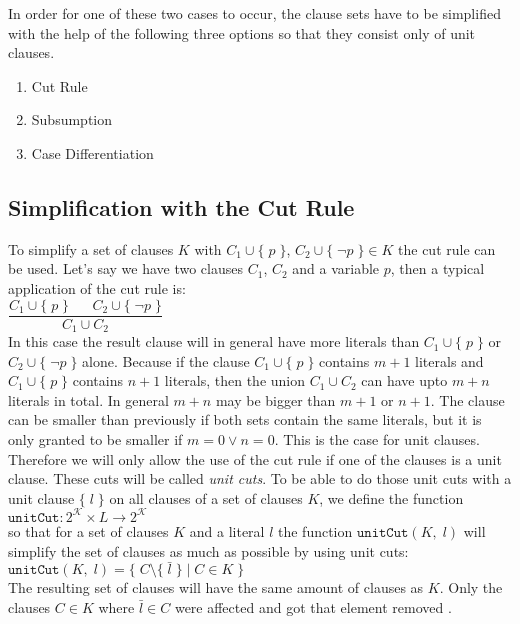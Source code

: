 In order for one of these two cases to occur, the clause sets have to be simplified with the help of the following three options so that they consist only of unit clauses.

\begin{enumerate}
  \item Cut Rule 
  \item Subsumption
  \item Case Differentiation
\end{enumerate}

\subsection{Simplification with the Cut Rule}
\label{sub:sciDavisPutnamCutRule}
To simplify a set of clauses $K$ with $C_1 \cup \{\; p\; \}$, $C_2 \cup \{\; \neg p\; \} \in K$ the cut rule can be used. Let's say we have two clauses $C_1$, $C_2$ and a variable $p$, then a typical application of the cut rule is:
\\[0.2cm]
\hspace*{1.3cm} $\dfrac{C_1 \cup \{\; p\; \} \;\;\;\;\;\; C_2 \cup \{\; \neg p\; \}}{C_1 \cup C_2}$
\\[0.2cm]
In this case the result clause will in general have more literals than $C_1 \cup \{\; p\; \}$ or $C_2 \cup \{\; \neg p\; \}$ alone. Because if the clause $C_1 \cup \{\; p\; \}$ contains $m + 1$ literals and $C_1 \cup \{\; p\; \}$ contains $n + 1$ literals, then the union $C_1 \cup C_2$ can have upto $m + n$ literals in total. In general $m + n$ may be bigger than $m + 1$ or $n + 1$. The clause can be smaller than previously if both sets contain the same literals, but it is only granted to be smaller if $m = 0 \lor n = 0$. This is the case for unit clauses. Therefore we will only allow the use of the cut rule if one of the clauses is a unit clause. These cuts will be called \emph{unit cuts}. To be able to do those unit cuts with a unit clause $\{\; l\; \}$ on all clauses of a set of clauses $K$, we define the function
\\[0.2cm]
\hspace*{1.3cm} $\texttt{unitCut}: 2^{\mathcal{K}} \times L \to 2^{\mathcal{K}}$
\\[0.2cm]
so that for a set of clauses $K$ and a literal $l$ the function $\texttt{unitCut}(K,\; l)$ will simplify the set of clauses as much as possible by using unit cuts:
\\[0.2cm]
\hspace*{1.3cm} $\texttt{unitCut}(K,\; l) = \{\; C \setminus \{\; \bar{l}\; \}\; |\; C \in K\; \}$
\\[0.2cm]
The resulting set of clauses will have the same amount of clauses as $K$. Only the clauses $C \in K$ where $\bar{l} \in C$ were affected and got that element removed \cite{Stroetman2019}. 

